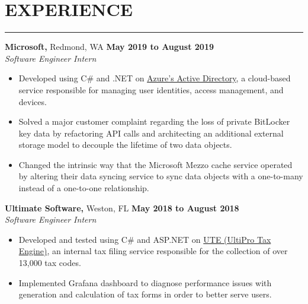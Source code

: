 \section*{EXPERIENCE}

\hrule \relax
\sectionheaderspace

\noindent \textbf{Microsoft,} Redmond, WA \hfill\textbf{May 2019 to August 2019}\\
\textit{Software Engineer Intern}
\begin{itemize}[noitemsep,nolistsep, label = {-}]
	\item Developed using C\# and .NET on \href{https://docs.microsoft.com/en-us/azure/active-directory/fundamentals/active-directory-whatis}{Azure's Active Directory}, a cloud-based service responsible for managing user identities, access management, and devices.
	\item Solved a major customer complaint regarding the loss of private BitLocker key data by refactoring API calls and architecting an additional external storage model to decouple the lifetime of two data objects.
	\item Changed the intrinsic way that the Microsoft Mezzo cache service operated by altering their data syncing service to sync data objects with a one-to-many instead of a one-to-one relationship.
\end{itemize}
\subsectionspace

\noindent \textbf{Ultimate Software,} Weston, FL \hfill\textbf{May 2018 to August 2018}\\
\textit{Software Engineer Intern}
\begin{itemize}[noitemsep,nolistsep, label = {-}]
	\item Developed and tested using C\# and ASP.NET on \href{https://www.ultimatesoftware.com/UltiPro-Solution-Features-Payment-Services}{UTE (UltiPro Tax Engine)}, an internal tax filing service responsible for the collection of over 13,000 tax codes.
	\item Implemented Grafana dashboard to diagnose performance issues with generation and calculation of tax forms in order to better serve users.
\end{itemize}
\subsectionspace
